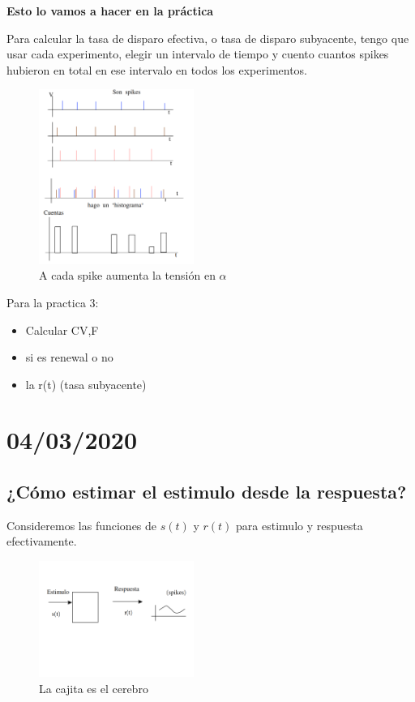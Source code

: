 {\bf Esto lo vamos a hacer en la práctica}

Para calcular la tasa de disparo efectiva, o  tasa de disparo subyacente, tengo que usar cada experimento, elegir un intervalo de tiempo y cuento cuantos spikes hubieron en total en ese intervalo en todos los experimentos.

\begin{figure}[H]
	\centering
	\includegraphics[width=0.45\textwidth]{2-3.png}
	\caption{A cada spike aumenta la tensión en $\alpha$}
\end{figure}

Para la practica 3: 
\begin{itemize}
	\item Calcular CV,F
	\item si es renewal o no
	\item la r(t) (tasa subyacente)
\end{itemize}


\section{04/03/2020}

\subsection{¿Cómo estimar el estimulo desde la respuesta?}

Consideremos las funciones de $s(t)$ y $r(t)$ para estimulo y respuesta efectivamente. 

\begin{figure}[H]
	\centering
	\includegraphics[width=0.45\textwidth]{3-1.png}
	\caption{La cajita es el cerebro}
\end{figure}

